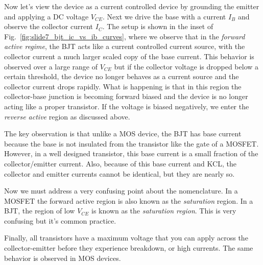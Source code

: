 Now let's view the device as a current controlled device by grounding the emitter and applying a DC voltage $V_{CE}$.  Next we drive the base with a current $I_B$ and observe the collector current $I_C$.  The setup is shown in the inset of Fig.~\ref{fig:slide7_bjt_ic_vs_ib_curves}, where we observe that in the \emph{forward active regime}, the BJT acts like a current controlled current source, with the collector current a much larger scaled copy of the base current.  This behavior is observed over a large range of $V_{CE}$ but if the collector voltage is dropped below a certain threshold, the device no longer behaves as a current source and the collector current drops rapidly.  What is happening is that in this region the collector-base junction is becoming forward biased and the device is no longer acting like a proper transistor. If the voltage is biased negatively, we enter the \emph{reverse active} region as discussed above.

The key observation is that unlike a MOS device, the BJT has base current because the base is not insulated from the transistor like the gate of a MOSFET.  However, in a well designed transistor, this base current is a small fraction of the collector/emitter current.  Also, because of this base current and KCL, the collector and emitter currents cannot be identical, but they are nearly so.

Now we must address a very confusing point about the nomenclature.  In a MOSFET the forward active region is also known as the \emph{saturation} region.  In a BJT, the region of low $V_{CE}$ is known as the \emph{saturation region}.  This is very confusing but it's common practice.

Finally, all transistors have a maximum voltage that you can apply across the collector-emitter before they experience breakdown, or high currents.  The same behavior is observed in MOS devices.  

